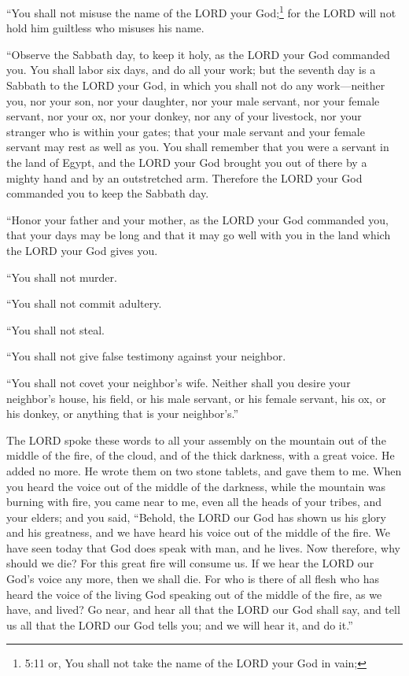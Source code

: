 	
	\myverse{}“You shall not misuse the name of the LORD your God;\footnote{5:11 or, You shall not take the name of the LORD your God in vain;} for the LORD will not
	hold him guiltless who misuses his name.
	
	
	\myverse{}“Observe the Sabbath day, to keep it holy, as the LORD your God
	commanded you.
	\myverse{}You shall labor six days, and do all your work;
	\myverse{}but the seventh day is a Sabbath to the LORD your God, in which you shall
	not do any work—neither you, nor your son, nor your daughter, nor your male servant, nor your female servant,
	nor your ox, nor your donkey, nor any of your livestock, nor your stranger who is within your gates; that
	your male servant and your female servant may rest as well as you.
	\myverse{}You shall remember that you were a servant in the land of Egypt, and the LORD
	your God brought you out of there by a mighty hand and by an outstretched arm. Therefore the LORD your
	God commanded you to keep the Sabbath day.
	
	
	\myverse{}“Honor your father and your mother, as the LORD your God commanded
	you, that your days may be long and that it may go well with you in the land which the LORD your God gives
	you.
	
	
	\myverse{}“You shall not murder.
	
	
	\myverse{}“You shall not commit adultery.
	
	
	\myverse{}“You shall not steal.
	
	
	\myverse{}“You shall not give false testimony against your neighbor.
	
	
	
	\myverse{}“You shall not covet your neighbor’s wife. Neither shall you
	desire your neighbor’s house, his field, or his male servant, or his female servant, his ox, or his donkey,
	or anything that is your neighbor’s.”
	
	
	\myverse{}The LORD spoke these words to all your assembly on the mountain
	out of the middle of the fire, of the cloud, and of the thick darkness, with a great voice. He added no
	more. He wrote them on two stone tablets, and gave them to me.
	\myverse{}When you heard the voice out of the middle of the darkness, while the mountain
	was burning with fire, you came near to me, even all the heads of your tribes, and your elders;
	\myverse{}and you said, “Behold, the LORD our God has shown us his glory and his greatness,
	and we have heard his voice out of the middle of the fire. We have seen today that God does speak with
	man, and he lives.
	\myverse{}Now therefore, why should we die? For this great fire will consume us. If
	we hear the LORD our God’s voice any more, then we shall die.
	\myverse{}For who is there of all flesh who has heard the voice of the living God speaking
	out of the middle of the fire, as we have, and lived?
	\myverse{}Go near, and hear all that the LORD our God shall say, and tell us all that
	the LORD our God tells you; and we will hear it, and do it.”
	
